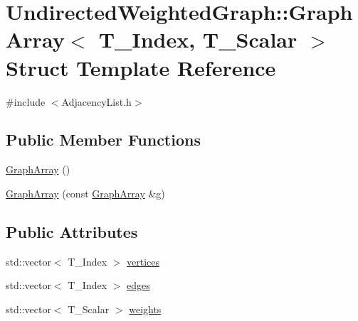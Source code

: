 \hypertarget{struct_undirected_weighted_graph_1_1_graph_array}{\section{Undirected\+Weighted\+Graph\+:\+:Graph\+Array$<$ T\+\_\+\+Index, T\+\_\+\+Scalar $>$ Struct Template Reference}
\label{struct_undirected_weighted_graph_1_1_graph_array}
}


{\ttfamily \#include $<$Adjacency\+List.\+h$>$}

\subsection*{Public Member Functions}
\begin{DoxyCompactItemize}
\item 
\hyperlink{struct_undirected_weighted_graph_1_1_graph_array_ad834e9b82b6494bc2bb23adff3a93bca}{Graph\+Array} ()
\item 
\hyperlink{struct_undirected_weighted_graph_1_1_graph_array_ae62dad780617d9c56c8cf16274f53d07}{Graph\+Array} (const \hyperlink{struct_undirected_weighted_graph_1_1_graph_array}{Graph\+Array} \&g)
\end{DoxyCompactItemize}
\subsection*{Public Attributes}
\begin{DoxyCompactItemize}
\item 
std\+::vector$<$ T\+\_\+\+Index $>$ \hyperlink{struct_undirected_weighted_graph_1_1_graph_array_a81fa36cd9facc14c41f4fcccde694f15}{vertices}
\item 
std\+::vector$<$ T\+\_\+\+Index $>$ \hyperlink{struct_undirected_weighted_graph_1_1_graph_array_ae11fa2a6dad43302b76d8c0c3cd43b8e}{edges}
\item 
std\+::vector$<$ T\+\_\+\+Scalar $>$ \hyperlink{struct_undirected_weighted_graph_1_1_graph_array_a56c78312ffe5c1948aeaf930cbb61fb3}{weights}
\end{DoxyCompactItemize}


